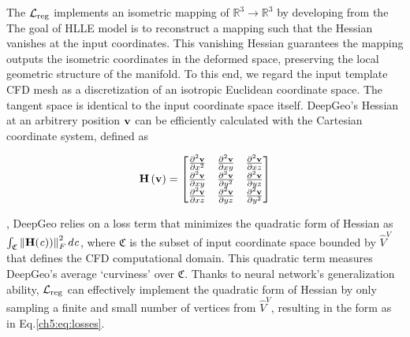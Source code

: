 The $\mathcal{L}_{\rm reg}$ implements an isometric mapping of $\mathbb{R}^3 \rightarrow \mathbb{R}^3$ by developing from the 
The goal of HLLE model is to reconstruct a mapping such that the Hessian vanishes at the input coordinates. 
This vanishing Hessian guarantees the mapping outputs the isometric coordinates in the deformed space, preserving the local geometric structure of the manifold.
To this end, we regard the input template CFD mesh as a discretization of an isotropic Euclidean coordinate space.
The tangent space is identical to the input coordinate space itself.
DeepGeo's Hessian at an arbitrery position $\mathbf{v}$ can be efficiently calculated with the Cartesian coordinate system, defined as
\begin{small}
\begin{align}
       \mathbf{H} \left( \mathbf{v} \right) 
      = \begin{bmatrix}
            \frac{\partial^2 \mathbf{v}}{\partial x^2} & \frac{\partial^2 \mathbf{v}}{\partial xy} &  \frac{\partial^2 \mathbf{v}}{\partial xz} \\
            \frac{\partial^2 \mathbf{v}}{\partial xy} & \frac{\partial^2 \mathbf{v}}{\partial y^2} &  \frac{\partial^2 \mathbf{v}}{\partial yz} \\
            \frac{\partial^2 \mathbf{v}}{\partial xz} & \frac{\partial^2 \mathbf{v}}{\partial yz} &  \frac{\partial^2 \mathbf{v}}{\partial y^2} \\
        \end{bmatrix}
\label{ch5:eq:L_reg} 
\end{align}
\end{small}
, DeepGeo relies on a loss term that minimizes the quadratic form of Hessian as $\int_{\mathfrak{C}} \left\| \mathbf{H}(\mathit{c})) \right\|^2_F d\mathit{c}$, where $\mathfrak{C}$ is the subset of input coordinate space bounded by $\hat{V}^V$ that defines the CFD computational domain.
This quadratic term measures DeepGeo's average ‘curviness’ over $\mathfrak{C}$.
Thanks to neural network's generalization ability, $\mathcal{L}_{\rm reg}$ can effectively implement the quadratic form of Hessian by only sampling a finite and small number of vertices from $\hat{V}^V$, resulting in the form as in Eq.\ref{ch5:eq:losses}.

\fi